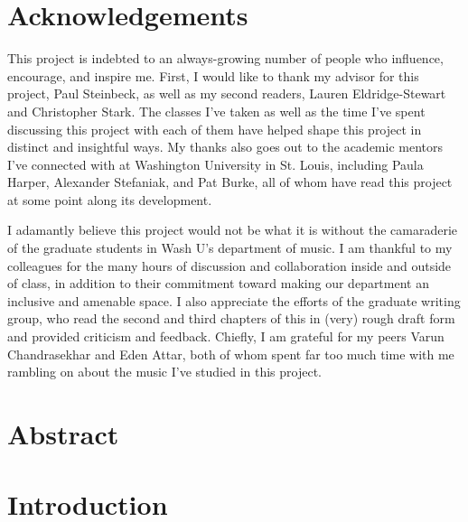 \documentclass[12pt]{report}
\begin{document}
\thispagestyle{empty}

\frenchspacing

\setcounter{page}{2}
    \tableofcontents
    \listoffigures
    \listoftables

    \chapter*{Acknowledgements}

 This project is indebted to an always-growing number of people who influence, encourage, and inspire me. First, I would like to thank my advisor for this project, Paul Steinbeck, as well as my second readers, Lauren Eldridge-Stewart and Christopher Stark. The classes I've taken as well as the time I've spent discussing this project with each of them have helped shape this project in distinct and insightful ways. My thanks also goes out to the academic mentors I've connected with at Washington University in St. Louis, including Paula Harper, Alexander Stefaniak, and Pat Burke, all of whom have read this project at some point along its development.
 
I adamantly believe this project would not be what it is without the camaraderie of the graduate students in Wash U's department of music. I am thankful to my colleagues for the many hours of discussion and collaboration inside and outside of class, in addition to their commitment toward making our department an inclusive and amenable space. I also appreciate the efforts of the graduate writing group, who read the second and third chapters of this in (very) rough draft form and provided criticism and feedback. Chiefly, I am grateful for my peers Varun Chandrasekhar and Eden Attar, both of whom spent far too much time with me rambling on about the music I've studied in this project.

    \chapter*{Abstract}
    \lipsum[0-1]

\chapter{Introduction}

\end{document}
